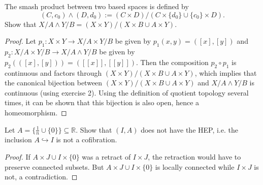\documentclass[12pt,a4paper]{article}
\newcommand{\R}{\mathbb{R}}
\begin{document}
\ex The smash product between two based spaces is defined by $$(C,c_0)\wedge (D,d_0):=(C\times D)/\left(C\times \{d_0\}\cup \{c_0\}\times D\right).$$ Show that $X/A\wedge Y/B=(X\times Y)/(X\times B\cup A\times Y)$.
\begin{proof}
Let $p_1:X\times Y\to X/A\times Y/B$ be given by $p_1(x,y)=([x],[y])$ and $p_2:X/A\times Y/B\to X/A \wedge Y/B$ be given by $p_2(([x],[y]))=([[x]],[[y]])$. Then the composition $p_2\circ p_1$ is continuous and factors through $(X\times Y)/(X\times B\cup A\times Y)$, which implies that the canonical bijection between $(X\times Y)/(X\times B\cup A\times Y)$ and $X/A \wedge Y/B$ is continuous (using exercise 2). Using the definition of quotient topology several times, it can be shown that this bijection is also open, hence a homeomorphism.
\end{proof}

\ex Let $A=\{\frac{1}{n}\cup \{0\}\}\subseteq \R$. Show that $(I,A)$ does not have the HEP, i.e. the inclusion $A \hookrightarrow I$ is not a cofibration.
\begin{proof}
If $A\times J \cup I\times\{0\}$ was a retract of $I\times J$, the retraction would have to preserve connected subsets. But $A\times J \cup I\times\{0\}$ is locally connected while $I\times J$ is not, a contradiction.
\end{proof}
\end{document}
